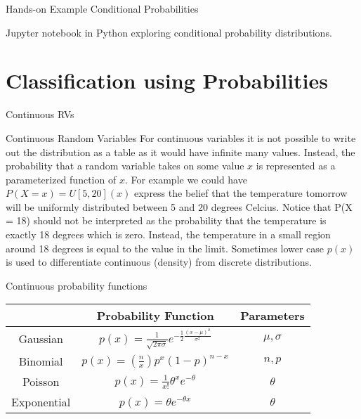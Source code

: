 \documentclass[12pt]{beamer}
\begin{document}
\begin{frame}{Hands-on Example Conditional Probabilities} 

Jupyter notebook in Python exploring conditional probability distributions. 
  
\end{frame}




\section{Classification using Probabilities} 


\begin{frame}{Continuous RVs} 
\begin{block}{Continuous Random Variables}
For continuous variables it is not possible to write out the
distribution as a table as it would have infinite many
values. Instead, the probability that a random variable takes on some
value $x$ is represented as a parameterized function of $x$. For
example we could have $P(X = x) = U[5,20](x)$ express the belief that
the temperature tomorrow will be uniformly distributed between 5 and
20 degrees Celcius. Notice that P(X = 18) should not be interpreted as
the probability that the temperature is exactly 18 degrees which is
zero.  Instead, the temperature in a small region around 18 degrees is
equal to the value in the limit. Sometimes lower case $p(x)$ is used to
differentiate continuous (density) from discrete distributions.
\end{block} 
\end{frame} 



\begin{frame}{Continuous probability functions} 

\begin{table} 
\begin{tabular}{|c|c|c|} 
\hline 
         & Probability Function & Parameters \\ 
\hline 
Gaussian & $p(x) = \frac{1}{\sqrt{2\pi\sigma}}e^{-\frac{1}{2}\frac{(x-\mu)^2}{\sigma^2}}$ & $\mu, \sigma$ \\[10pt] 
\hline 
Binomial & $p(x) = \left ( \frac{n}{x} \right ) p^x(1-p)^{n-x}$ & $n,p$ \\[10pt]
\hline
Poisson  & $p(x) = \frac{1}{x!} \theta^{x} e^{-\theta}$ & $\theta$ \\[10pt] 
\hline 
Exponential & $p(x) = \theta e^{-\theta x}$ & $\theta$ \\[10pt] 
\hline 
\end{tabular} 
\end{table} 


\end{frame}
\end{document}
